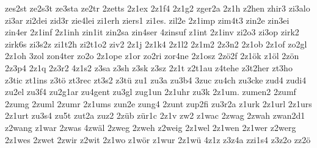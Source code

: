 {zes2st
ze2s3t
ze3sta
ze2tr
2zetts
2z1ex
2z1f4
2z1g2
zger2a
2z1h
z2hen
zhir3
zi3alo
zi3ar
zi2dei
zid3r
zie4lei
zi1erh
ziers1
zi1es.
zil2e
2z1imp
zim4t3
zin2e
zin3ei
zin4er
2z1inf
2z1inh
zin1it
zin2sa
zin4ser
4zinsuf
z1int
2z1inv
zi2o3
zi3op
zirk2
zirk6s
zi3s2z
zi1t2h
zi2t1o2
ziv2
2z1j
2z1k4
2z1l2
2z1m2
2z3n2
2z1ob
2z1of
zo2gl
2z1oh
3zol
zon4ter
zo2o
2z1ope
z1or
zo2ri
zor4ne
2z1osz
2zö2f
2z1ök
z1öl
2zön
2z3p4
2z1q
2z3r2
4z1s2
z3sa
z3sh
z3sk
z3sz
2z1t
z2t1au
z4tehe
z3t2her
zt3ho
z3tic
zt1ins
z3tö
zt3rec
zt3s2
z3tü
zu1
zu3a
zu3b4
3zuc
zu4ch
zu3cke
zud4
zudi4
zu2el
zu3f4
zu2g1ar
zu4gent
zu3gl
zug1un
2z1uhr
zu3k
2z1um.
zumen2
2zumf
2zumg
2zuml
2zumr
2z1ums
zun2e
zung4
2zunt
zup2fi
zu3r2a
z1urk
2z1url
2z1urs
2z1urt
zu3s4
zu5t
zut2a
zuz2
2züb
zür1c
2z1v
zw2
z1wac
2zwag
2zwah
zwan2d1
z2wang
z1war
2zwas
4zwäl
2zweg
2zweh
z2weig
2z1wel
2z1wen
2z1wer
z2werg
2z1wes
2zwet
2zwir
z2wit
2z1wo
z1wör
z1wur
2z1wü
4z1z
z3z4a
zzi1s4
z3z2o
zz2ö
}

\endinput

